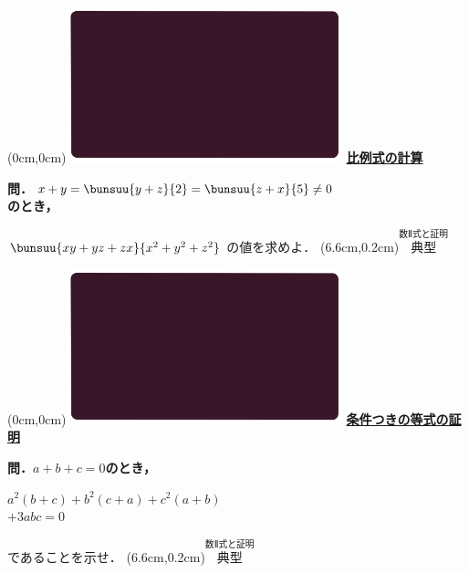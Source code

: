 \documentclass[10pt,
fleqn,
dvipdfmx,
uplatex
]{jsarticle}
\begin{document}
\newpage



\at(0cm,0cm){\includegraphics[width=8cm,bb=0 0 1920 1080]{./media_local/smart_background/数II式と証明.jpeg}}
{\color{orange}\bf\boldmath\huge\underline{比例式の計算}}\vspace{0.3zw}

\large 
\bf\boldmath 問．$x+y=\bunsuu{{y+z}}{2}=\bunsuu{{z+x}}{5}\neq 0$\\
\hfill のとき，\vspace{-0.3zw}

\LARGE 
\hspace{0.3zw}$\bunsuu{{xy+yz+zx}}{{x^2+y^2+z^2}}$
\large の値を求めよ．
\at(6.6cm,0.2cm){\small\color{bradorange}$\overset{\text{数Ⅱ式と証明}}{\text{典型}}$}


\newpage



\at(0cm,0cm){\includegraphics[width=8cm,bb=0 0 1920 1080]{./media_local/smart_background/数II式と証明.jpeg}}
{\color{orange}\bf\boldmath\LARGE\underline{条件つきの等式の証明}}\vspace{0.3zw}

\LARGE 
\bf\boldmath 問．$a+b+c=0$のとき，

\large
\vspace{0.5zw}
\hspace{0.3zw}$a^2\left(b+c\right)+b^2\left(c+a\right)+c^2\left(a+b\right)$\\
\hfill $+3abc=0$

\LARGE 
であることを示せ．
\at(6.6cm,0.2cm){\small\color{bradorange}$\overset{\text{数Ⅱ式と証明}}{\text{典型}}$}
\end{document}
